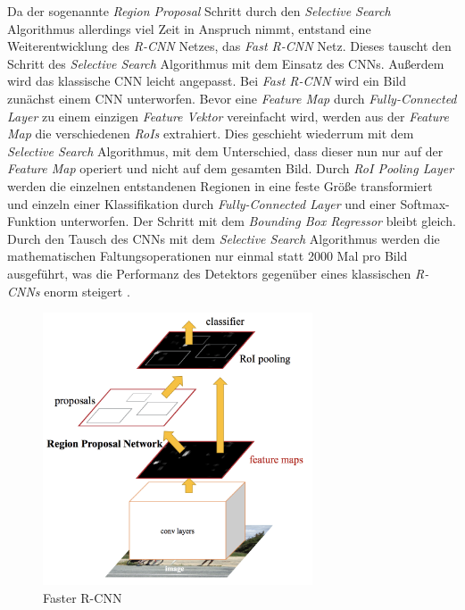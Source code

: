 Da der sogenannte \textit{Region Proposal} Schritt durch den \textit{Selective Search} Algorithmus allerdings viel Zeit in Anspruch nimmt, entstand eine Weiterentwicklung des \textit{R-CNN } Netzes, das \textit{Fast R-CNN} Netz. Dieses tauscht den Schritt des \textit{Selective Search} Algorithmus mit dem Einsatz des CNNs. Außerdem wird das klassische CNN leicht angepasst. Bei \textit{Fast R-CNN} wird ein Bild zunächst einem CNN unterworfen. Bevor eine \textit{Feature Map} durch \textit{Fully-Connected Layer} zu einem einzigen \textit{Feature Vektor} vereinfacht wird, werden aus der \textit{Feature Map} die verschiedenen \textit{RoIs} extrahiert. Dies geschieht wiederrum mit dem \textit{Selective Search} Algorithmus, mit dem Unterschied, dass dieser nun nur auf der \textit{Feature Map} operiert und nicht auf dem gesamten Bild. Durch \textit{RoI Pooling Layer} werden die einzelnen entstandenen Regionen in eine feste Größe transformiert und einzeln einer Klassifikation durch \textit{Fully-Connected Layer} und einer Softmax-Funktion unterworfen. Der Schritt mit dem \textit{Bounding Box Regressor} bleibt gleich. Durch den Tausch des CNNs mit dem \textit{Selective Search} Algorithmus werden die mathematischen Faltungsoperationen nur einmal statt 2000 Mal pro Bild ausgeführt, was die Performanz des Detektors gegenüber eines klassischen \textit{R-CNNs} enorm steigert \cite{RohithGandhi.20180709}.

\begin{figure}[ht]
	\begin{center}
		\includegraphics[width=8cm]{Bilder/fasterrcnn.png} 
		\caption[Faster R-CNN]{Faster R-CNN \cite{RohithGandhi.20180709}}
		\label{fasterrcnn}
	\end{center}
\end{figure}

